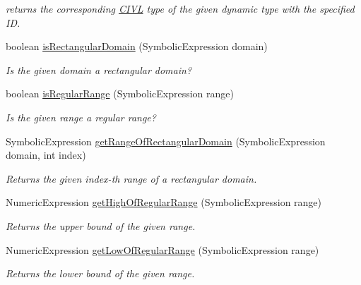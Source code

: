 \begin{DoxyCompactItemize}
\begin{DoxyCompactList}\small\item\em returns the corresponding \hyperlink{classedu_1_1udel_1_1cis_1_1vsl_1_1civl_1_1CIVL}{C\+I\+V\+L} type of the given dynamic type with the specified I\+D. \end{DoxyCompactList}\item 
boolean \hyperlink{interfaceedu_1_1udel_1_1cis_1_1vsl_1_1civl_1_1dynamic_1_1IF_1_1SymbolicUtility_ada8294a7662922a67414f2db5a68f554}{is\+Rectangular\+Domain} (Symbolic\+Expression domain)
\begin{DoxyCompactList}\small\item\em Is the given domain a rectangular domain? \end{DoxyCompactList}\item 
boolean \hyperlink{interfaceedu_1_1udel_1_1cis_1_1vsl_1_1civl_1_1dynamic_1_1IF_1_1SymbolicUtility_aa3d03db3e74d45603a62b9540dcb478b}{is\+Regular\+Range} (Symbolic\+Expression range)
\begin{DoxyCompactList}\small\item\em Is the given range a regular range? \end{DoxyCompactList}\item 
Symbolic\+Expression \hyperlink{interfaceedu_1_1udel_1_1cis_1_1vsl_1_1civl_1_1dynamic_1_1IF_1_1SymbolicUtility_a78bb80c8c383c01324b44eba72698b64}{get\+Range\+Of\+Rectangular\+Domain} (Symbolic\+Expression domain, int index)
\begin{DoxyCompactList}\small\item\em Returns the given index-\/th range of a rectangular domain. \end{DoxyCompactList}\item 
Numeric\+Expression \hyperlink{interfaceedu_1_1udel_1_1cis_1_1vsl_1_1civl_1_1dynamic_1_1IF_1_1SymbolicUtility_a3412a53bd2318815dbcf12d98a131c99}{get\+High\+Of\+Regular\+Range} (Symbolic\+Expression range)
\begin{DoxyCompactList}\small\item\em Returns the upper bound of the given range. \end{DoxyCompactList}\item 
Numeric\+Expression \hyperlink{interfaceedu_1_1udel_1_1cis_1_1vsl_1_1civl_1_1dynamic_1_1IF_1_1SymbolicUtility_a5b53945651fbf5d75629142ea16ba735}{get\+Low\+Of\+Regular\+Range} (Symbolic\+Expression range)
\begin{DoxyCompactList}\small\item\em Returns the lower bound of the given range. \end{DoxyCompactList}\item 

\end{DoxyCompactItemize}
